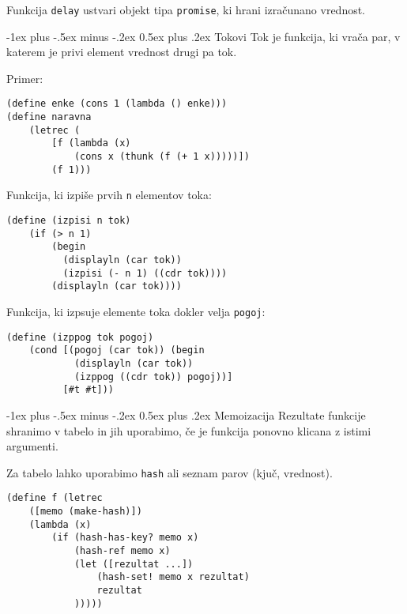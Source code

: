 \documentclass[a3paper,9pt]{extarticle}
\makeatletter
\renewcommand{\section}{\@startsection{section}{1}{0mm}%
                                {-1ex plus -.5ex minus -.2ex}%
                                {0.5ex plus .2ex}%
                                {\normalfont\large\bfseries}}
\makeatother
\begin{document}
\begin{multicols}{4}
Funkcija \lstinline|delay| ustvari objekt tipa \lstinline|promise|, ki hrani izračunano vrednost.

\section{Tokovi}
Tok je funkcija, ki vrača par, v katerem je privi element vrednost drugi pa tok.

Primer:
\begin{lstlisting}
(define enke (cons 1 (lambda () enke)))
(define naravna 
    (letrec (
        [f (lambda (x) 
            (cons x (thunk (f (+ 1 x)))))]) 
        (f 1)))
\end{lstlisting}

Funkcija, ki izpiše prvih \lstinline|n| elementov toka:
\begin{lstlisting}
(define (izpisi n tok)
    (if (> n 1) 
        (begin
          (displayln (car tok))
          (izpisi (- n 1) ((cdr tok))))
        (displayln (car tok))))
\end{lstlisting}

Funkcija, ki izpsuje elemente toka dokler velja \lstinline|pogoj|:
\begin{lstlisting}
(define (izppog tok pogoj)
    (cond [(pogoj (car tok)) (begin
            (displayln (car tok))
            (izppog ((cdr tok)) pogoj))]
          [#t #t]))
\end{lstlisting}

\section{Memoizacija}
Rezultate funkcije shranimo v tabelo in jih uporabimo, če je funkcija ponovno klicana z istimi argumenti.

Za tabelo lahko uporabimo \lstinline|hash| ali seznam parov (kjuč, vrednost).

\begin{lstlisting}
(define f (letrec 
    ([memo (make-hash)])
    (lambda (x) 
        (if (hash-has-key? memo x) 
            (hash-ref memo x) 
            (let ([rezultat ...])
                (hash-set! memo x rezultat)
                rezultat
            )))))
\end{lstlisting}


\end{multicols}
\end{document}
